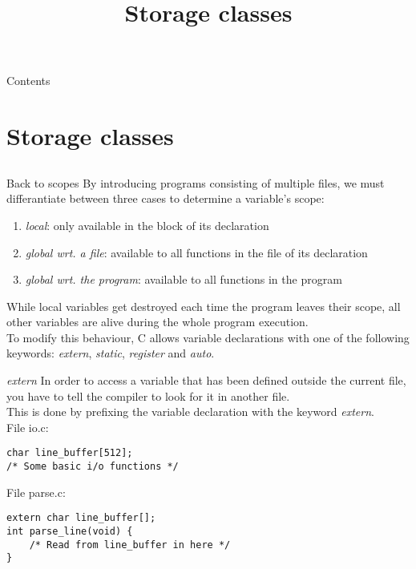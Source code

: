 
\newcommand{\topic}{
	Storage classes
}

\title{\topic}
\supertitle{\course}
\date{}



\maketitle

\begin{frame}{Contents}
	\tableofcontents
\end{frame}
\section{Storage classes}
\subsection{}

\begin{frame}{Back to scopes}
	By introducing programs consisting of multiple files, we must differantiate between three cases to determine a variable's scope:
	\begin{enumerate}
		\item \textit{local}: only available in the block of its declaration
		\item \textit{global wrt. a file}: available to all functions in the file of its declaration
		\item \textit{global wrt. the program}: available to all functions in the program
	\end{enumerate}\bigskip
	While local variables get destroyed each time the program leaves their scope, all other variables are alive during the whole program execution.\\ \bigskip
	To modify this behaviour, C allows variable declarations with one of the following keywords: \textit{extern}, \textit{static}, \textit{register} and \textit{auto}.
\end{frame}

\begin{frame}[fragile = singleslide]{\textit{extern}}
	In order to access a variable that has been defined outside the current file, you have to tell the compiler to look for it in another file.\\
	This is done by prefixing the variable declaration with the keyword \textit{extern}.\\
	\bigskip
	File io.c:
	\begin{lstlisting}
char line_buffer[512];
/* Some basic i/o functions */
\end{lstlisting}
	File parse.c:
	\begin{lstlisting}
extern char line_buffer[];
int parse_line(void) {
	/* Read from line_buffer in here */
}
\end{lstlisting}

\end{frame}

